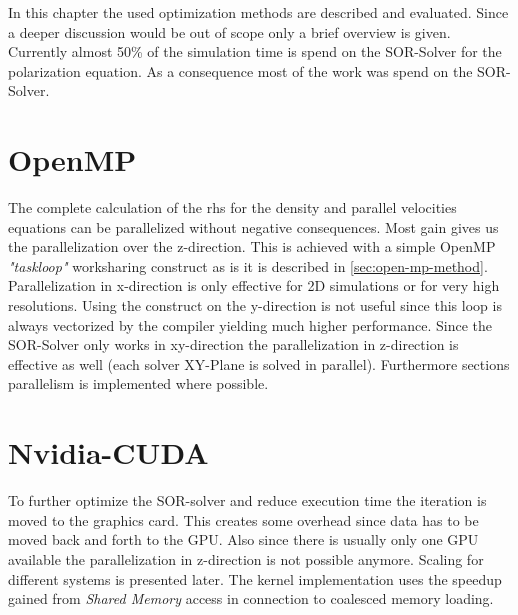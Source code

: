 \documentclass[master.tex]{subfiles}
\begin{document}
In this chapter the used optimization methods are described and evaluated. Since a deeper discussion would be out of scope only a brief overview is given. Currently almost 50\% of the simulation time is spend on the SOR-Solver for the polarization equation. As a consequence most of the work was spend on the SOR-Solver.
\section{OpenMP}
The complete calculation of the \ac{rhs} for the density and parallel velocities equations can be parallelized without negative consequences. Most gain gives us the parallelization over the z-direction. This is achieved with a simple OpenMP \textit{"taskloop"} worksharing construct as is it is described in \autoref{sec:open-mp-method}. Parallelization in x-direction is only effective for 2D simulations or for very high resolutions. Using the construct on the y-direction is not useful since this loop is always vectorized by the compiler yielding much higher performance. Since the SOR-Solver only works in xy-direction the parallelization in z-direction is effective as well (each solver XY-Plane is solved in parallel). Furthermore sections parallelism is implemented where possible.

\section{Nvidia-CUDA}
To further optimize the SOR-solver and reduce execution time the iteration is moved to the graphics card. This creates some overhead since data has to be moved back and forth to the GPU. Also since there is usually only one GPU available the parallelization in z-direction is not possible anymore. Scaling for different systems is presented later. The kernel implementation uses the speedup gained from \textit{Shared Memory} access in connection to coalesced memory loading.
\end{document}
